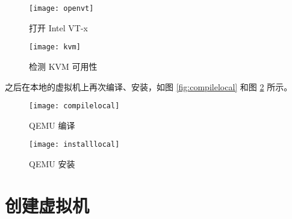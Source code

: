     \begin{figure}[h]
        \centering
        \begin{minipage}{0.48\textwidth}
            \centering
            \texttt{[image: openvt]}
            \caption{打开 Intel VT-x}\label{fig:openvt}
        \end{minipage}
        \begin{minipage}{0.48\textwidth}
            \centering
            \texttt{[image: kvm]}
            \caption{检测 KVM 可用性}\label{fig:kvm}
        \end{minipage}
    \end{figure}

    之后在本地的虚拟机上再次编译、安装，如图 \ref{fig:compilelocal} 和图 \ref{fig:installlocal} 所示。

    \begin{figure}[h]
        \centering
        \begin{minipage}{0.48\textwidth}
            \centering
            \texttt{[image: compilelocal]}
            \caption{QEMU 编译}\label{fig:compilelocal}
        \end{minipage}
        \begin{minipage}{0.48\textwidth}
            \texttt{[image: installlocal]}
            \caption{QEMU 安装}\label{fig:installlocal}
        \end{minipage}
    \end{figure}

    \section{创建虚拟机}
    


    
